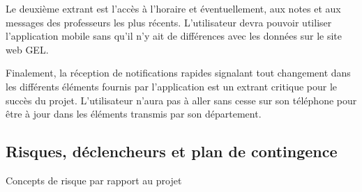 	Le deuxième extrant est l’accès à l’horaire et éventuellement, aux notes et aux messages des professeurs les plus récents. L’utilisateur devra pouvoir utiliser l’application mobile sans qu'il n'y ait de différences avec les données sur le site web GEL.

	Finalement, la réception de notifications rapides signalant tout changement dans les différents éléments fournis par l’application est un extrant critique pour le succès du projet. L’utilisateur n'aura pas à aller sans cesse sur son téléphone pour être à jour dans les éléments transmis par son département.

	\subsection{Risques, déclencheurs et plan de contingence}
	\begin{table}[hp]
		\centering
		
		\caption{Concepts de risque par rapport au projet}
		\label{tab.risques}
	\end{table}